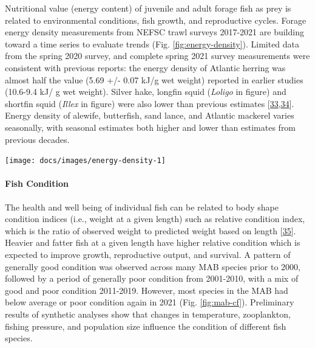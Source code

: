\documentclass[
  10pt,
]{article}
\let\origfigure\figure
\let\endorigfigure\endfigure
\renewenvironment{figure}[1][2] {
    \expandafter\origfigure\expandafter[H]
} {
    \endorigfigure
}
\begin{document}
Nutritional value (energy content) of juvenile and adult forage fish as
prey is related to environmental conditions, fish growth, and
reproductive cycles. Forage energy density measurements from NEFSC trawl
surveys 2017-2021 are building toward a time series to evaluate trends
(Fig. \ref{fig:energy-density}). Limited data from the spring 2020
survey, and complete spring 2021 survey measurements were consistent
with previous reports: the energy density of Atlantic herring was almost
half the value (5.69 +/- 0.07 kJ/g wet weight) reported in earlier
studies (10.6-9.4 kJ/ g wet weight). Silver hake, longfin squid
(\emph{Loligo} in figure) and shortfin squid (\emph{Illex} in figure)
were also lower than previous estimates
{[}\protect\hyperlink{ref-steimle_energy_1985}{33},\protect\hyperlink{ref-lawson_important_1998}{34}{]}.
Energy density of alewife, butterfish, sand lance, and Atlantic mackerel
varies seasonally, with seasonal estimates both higher and lower than
estimates from previous decades.

\begin{figure}

{\centering \texttt{[image: docs/images/energy-density-1]} 

}

\caption{Forage fish energy density mean and standard deviation by season and year, compared with 1980s (solid line; Steimle and Terranove 1985) and 1990s (dashed line; Lawson et al. 1998) values.}\label{fig:energy-density}
\end{figure}

\hypertarget{fish-condition}{%
\paragraph{Fish Condition}\label{fish-condition}}

The health and well being of individual fish can be related to body
shape condition indices (i.e., weight at a given length) such as
relative condition index, which is the ratio of observed weight to
predicted weight based on length
{[}\protect\hyperlink{ref-le_cren_length-weight_1951}{35}{]}. Heavier
and fatter fish at a given length have higher relative condition which
is expected to improve growth, reproductive output, and survival. A
pattern of generally good condition was observed across many MAB species
prior to 2000, followed by a period of generally poor condition from
2001-2010, with a mix of good and poor condition 2011-2019. However,
most species in the MAB had below average or poor condition again in
2021 (Fig. \ref{fig:mab-cf}). Preliminary results of synthetic analyses
show that changes in temperature, zooplankton, fishing pressure, and
population size influence the condition of different fish species.
\end{document}
